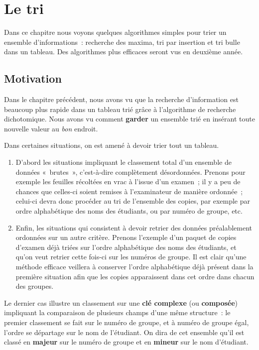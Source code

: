\chapter{Le tri}

	Dans ce chapitre nous voyons quelques algorithmes simples pour trier un
	ensemble d’informations~: recherche des maxima, tri
	par insertion et tri bulle dans un tableau. 
	Des algorithmes plus efficaces seront vus
	en deuxième année.

\section{Motivation}

	Dans le chapitre précédent,
	nous avons vu que la recherche d’information est beaucoup
	plus rapide dans un tableau trié 
	grâce à l’algorithme de recherche dichotomique.
	Nous avons vu comment \textbf{garder} un ensemble trié
	en insérant toute nouvelle valeur au \emph{bon} endroit.

	Dans certaines situations,
	on est amené à devoir trier tout un tableau.

	\begin{enumerate}
		\item 
			D’abord les situations impliquant le classement total d’un ensemble de
			données «~brutes~», c’est-à-dire complètement désordonnées. Prenons
			pour exemple les feuilles récoltées en vrac à l’issue d’un examen~; il
			y a peu de chances que celles-ci soient remises à l’examinateur de
			manière ordonnée~; celui-ci devra donc procéder au tri de l’ensemble
			des copies, par exemple par ordre alphabétique des noms des étudiants,
			ou par numéro de groupe, etc.
		\item 
			Enfin, les situations qui consistent à devoir retrier des données
			préalablement ordonnées sur un autre critère. Prenons l’exemple d’un
			paquet de copies d’examen déjà triées sur l’ordre alphabétique des noms
			des étudiants, et qu’on veut retrier cette fois-ci sur les numéros de
			groupe. Il est clair qu’une méthode efficace veillera à conserver
			l’ordre alphabétique déjà présent dans la première situation afin que
			les copies apparaissent dans cet ordre dans chacun des groupes.
	\end{enumerate}
	
	Le dernier cas illustre un classement sur une \textbf{clé complexe}
	(ou \textbf{composée}) impliquant la comparaison de plusieurs champs
	d’une même structure~: le premier classement se fait sur le numéro de
	groupe, et à numéro de groupe égal, l’ordre se départage sur le nom de
	l’étudiant. On dira de cet ensemble qu’il est classé en \textbf{majeur}
	sur le numéro de groupe et en \textbf{mineur} sur le nom d’étudiant.

